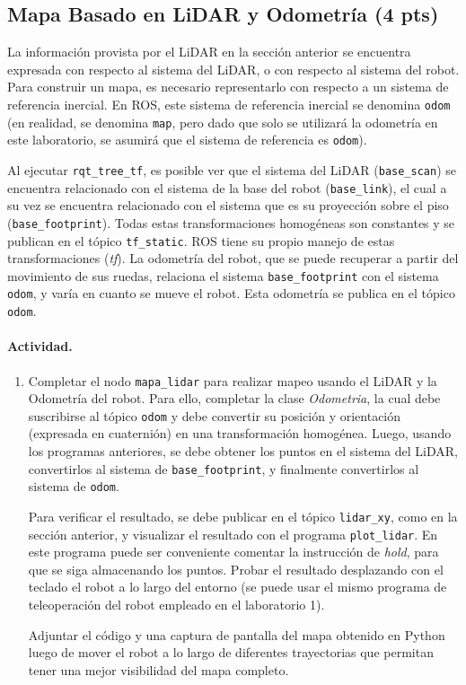\documentclass[a4paper,11pt]{robotlabs}
\begin{document}
\subsection{Mapa Basado en LiDAR y Odometría (4 pts)}

La información provista por el LiDAR en la sección anterior se encuentra
expresada con respecto al sistema del LiDAR, o con respecto al sistema del
robot. Para construir un mapa, es necesario representarlo con respecto a un
sistema de referencia inercial. En ROS, este sistema de referencia inercial se
denomina \texttt{odom} (en realidad, se denomina \texttt{map}, pero dado que
solo se utilizará la odometría en este laboratorio, se asumirá que el sistema
de referencia es \texttt{odom}).

Al ejecutar \texttt{rqt\_tree\_tf}, es posible ver que el sistema del LiDAR
(\texttt{base\_scan}) se encuentra relacionado con el sistema de la base del
robot (\texttt{base\_link}), el cual a su vez se encuentra relacionado con el
sistema que es su proyección sobre el piso (\texttt{base\_footprint}). Todas
estas transformaciones homogéneas son constantes y se publican en el tópico
\texttt{tf\_static}. ROS tiene su propio manejo de estas transformaciones
(\textit{tf}). La odometría del robot, que se puede recuperar a partir del
movimiento de sus ruedas, relaciona el sistema \texttt{base\_footprint} con el
sistema \texttt{odom}, y varía en cuanto se mueve el robot. Esta odometría se
publica en el tópico \texttt{odom}.

\paragraph{Actividad.}

\begin{enumerate}
\item Completar el nodo \texttt{mapa\_lidar} para realizar mapeo usando el
  LiDAR y la Odometría del robot. Para ello, completar la clase
  \textit{Odometria}, la cual debe suscribirse al tópico \texttt{odom} y debe
  convertir su posición y orientación (expresada en cuaternión) en una
  transformación homogénea. Luego, usando los programas anteriores, se debe
  obtener los puntos en el sistema del LiDAR, convertirlos al sistema de
  \texttt{base\_footprint}, y finalmente convertirlos al sistema de
  \texttt{odom}.

  Para verificar el resultado, se debe publicar en el tópico
  \texttt{lidar\_xy}, como en la sección anterior, y visualizar el resultado
  con el programa \texttt{plot\_lidar}. En este programa puede ser conveniente
  comentar la instrucción de \textit{hold}, para que se siga almacenando los
  puntos. Probar el resultado desplazando con el teclado el robot a lo largo
  del entorno (se puede usar el mismo programa de teleoperación del robot
  empleado en el laboratorio 1).

  Adjuntar el código y una captura de pantalla del mapa obtenido en Python
  luego de mover el robot a lo largo de diferentes trayectorias que permitan
  tener una mejor visibilidad del mapa completo.
  
\end{enumerate}
\end{document}
